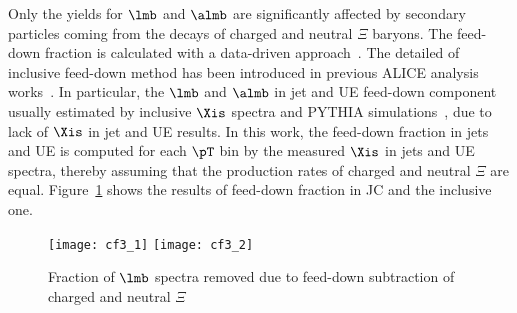 Only the yields for $\lmb$ and $\almb$ are significantly affected by secondary particles coming from the decays of charged and neutral $\Xi$ baryons. The feed-down fraction is calculated with a data-driven approach~\cite{Abelev:2013haa}. The detailed of inclusive feed-down method has been introduced in previous ALICE analysis works~\cite{Acharya:2019kyh, Acharya:2020uxl, ALICE:2017jyt}. In particular, the $\lmb$ and $\almb$ in jet and UE feed-down component usually estimated by inclusive $\Xis$ spectra and PYTHIA simulations~\cite{V0injet}, due to lack of $\Xis$ in jet and UE results. In this work, the feed-down fraction in jets and UE is computed for each $\pT$ bin by the measured $\Xis$ in jets and UE spectra, thereby assuming that the production rates of charged and neutral $\Xi$ are equal. Figure~\ref{fig:FdFrac} shows the results of feed-down fraction in JC and the inclusive one.
 \begin{figure}[!ht]
 	\begin{center}
 		\texttt{[image: cf3\_1]}
 		\texttt{[image: cf3\_2]}
 	\end{center}
 	\caption{Fraction of $\lmb$ spectra removed due to feed-down subtraction of charged and neutral $\Xi$}
 	\label{fig:FdFrac}
 \end{figure}

